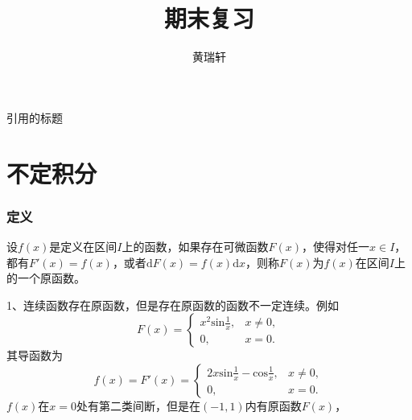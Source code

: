 \documentclass{SCIS2020cn}
\begin{document}
\DOI{}
\ReceiveDate{}
\ReviseDate{}
\AcceptDate{}
\OnlineDate{}

\title{期末复习}{引用的标题}


\author[]{黄瑞轩}{}


\address[1]{ }
\address[2]{ }
\address[3]{ }



\AuthorCitation{ }
\enAuthorCitation{ }


\maketitle
\part{不定积分}

\section{定义}
\begin{definition}[原函数]\label{def1}
设$f(x)$是定义在区间$I$上的函数，如果存在可微函数$F(x)$，使得对任一$x\in{}I$，都有$F'(x)=f(x)$，或者$\text{d}F(x)=f(x)\text{d}x$，则称$F(x)$为$f(x)$在区间$I$上的一个原函数。
\end{definition}

1、连续函数存在原函数，但是存在原函数的函数不一定连续。例如
\[F(x)=\left\{\begin{array}{ll}

x^2\text{sin}\frac{1}{x},&\text{$x\neq0$},\\

0,&\text{$x=0$}.

\end{array}\right.\]
其导函数为
\[f(x)=F'(x)=\left\{\begin{array}{ll}

2x\text{sin}\frac{1}{x}-\text{cos}\frac{1}{x},&\text{$x\neq0$},\\

0,&\text{$x=0$}.
\end{array}\right.\]
$f(x)$在$x=0$处有第二类间断，但是在$(-1,1)$内有原函数$F(x)$，
\end{document}
